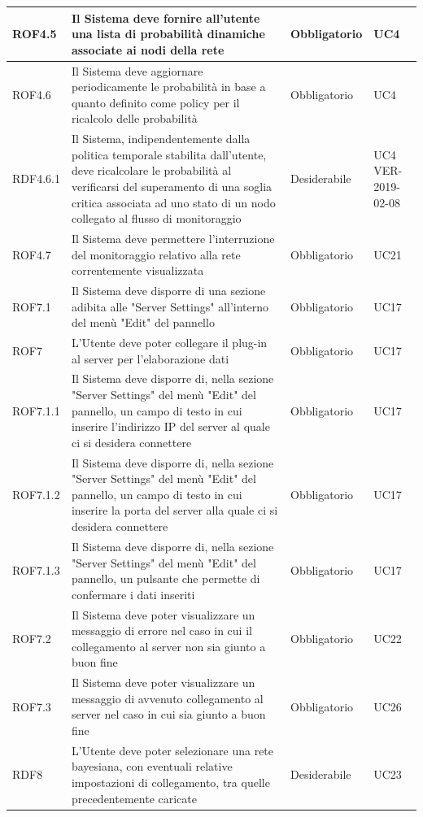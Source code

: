 \begin{center}
\begin{longtable}[c]{|m{}|m{}|m{}|m{}|}
\hline
ROF4.5 & Il Sistema deve fornire all'utente una lista di probabilità dinamiche associate ai nodi della rete & Obbligatorio & UC4\\
\hline
\rowcolor{grigio}ROF4.6 & Il Sistema deve aggiornare periodicamente le probabilità in base a quanto definito come policy per il ricalcolo delle probabilità & Obbligatorio & UC4\\
\hline
RDF4.6.1 & Il Sistema, indipendentemente dalla politica temporale stabilita dall'utente, deve ricalcolare le probabilità al verificarsi del superamento di una soglia critica associata ad uno stato di un nodo collegato al flusso di monitoraggio & Desiderabile & UC4 VER-2019-02-08\\
\hline
ROF4.7 & Il Sistema deve permettere l'interruzione del monitoraggio relativo alla rete correntemente visualizzata & Obbligatorio & UC21\\
\hline
\rowcolor{grigio}ROF7.1 & Il Sistema deve disporre di una sezione adibita alle "Server Settings" all'interno del menù "Edit" del pannello & Obbligatorio & UC17\\
\hline
ROF7 & L'Utente deve poter collegare il plug-in al server per l'elaborazione dati & Obbligatorio & UC17\\
\hline
ROF7.1.1 & Il Sistema deve disporre di, nella sezione "Server Settings" del menù "Edit" del pannello, un campo di testo in cui inserire l'indirizzo IP del server al quale ci si desidera connettere & Obbligatorio & UC17\\
\hline
\rowcolor{grigio}ROF7.1.2 & Il Sistema deve disporre di, nella sezione "Server Settings" del menù "Edit" del pannello, un campo di testo in cui inserire la porta del server alla quale ci si desidera connettere & Obbligatorio & UC17\\
\hline
ROF7.1.3 & Il Sistema deve disporre di, nella sezione "Server Settings" del menù "Edit" del pannello, un pulsante che permette di confermare i dati inseriti & Obbligatorio & UC17\\
\hline
\rowcolor{grigio}ROF7.2 & Il Sistema deve poter visualizzare un messaggio di errore nel caso in cui il collegamento al server non sia giunto a buon fine& Obbligatorio & UC22\\
\hline
ROF7.3 & Il Sistema deve poter visualizzare un messaggio di avvenuto collegamento al server nel caso in cui sia giunto a buon fine & Obbligatorio & UC26\\
\hline
RDF8 & L'Utente deve poter selezionare una rete bayesiana, con eventuali relative impostazioni di collegamento, tra quelle precedentemente caricate & Desiderabile & UC23\\

\end{longtable}
\end{center}

